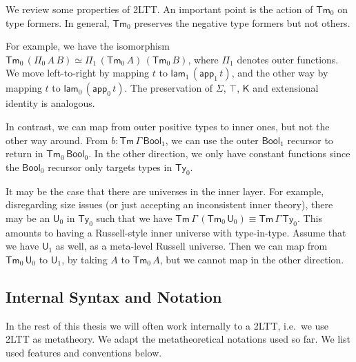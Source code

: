 \documentclass[12pt,a4paper,twoside,openany]{book}
\theoremstyle{remark}
\theoremstyle{definition}
\theoremstyle{theorem}
\newcommand{\ms}[1]{\mathsf{#1}}
\newcommand{\Tm}{\mathsf{Tm}}
\newcommand{\Ty}{\mathsf{Ty}}
\newcommand{\U}{\mathsf{U}}
\newcommand{\K}{\mathsf{K}}
\newcommand{\app}{\ms{app}}
\newcommand{\Bool}{\ms{Bool}}
\newcommand{\lam}{\ms{lam}}
\begin{document}
We review some properties of 2LTT. An important point is the action of $\Tm_0$
on type formers. In general, $\Tm_0$ preserves the negative type formers but not
others.

For example, we have the isomorphism $\Tm_0\,(\Pi_0\,A\,B) \simeq
\Pi_1\,(\Tm_0\,A)\,(\Tm_0\,B)$, where $\Pi_1$ denotes outer functions.  We move
left-to-right by mapping $t$ to $\lam_1\,(\app_1\,t)$, and the other way by
mapping $t$ to $\lam_0\,(\app_0\,t)$. The preservation of $\Sigma$, $\top$, $\K$
and extensional identity is analogous.

In contrast, we can map from outer positive types to inner ones, but not the
other way around. From $b : \Tm\,\Gamma\,\Bool_1$, we can use the outer
$\Bool_1$ recursor to return in $\Tm_0\,\Bool_0$. In the other direction, we
only have constant functions since the $\Bool_0$ recursor only targets types in
$\Ty_0$.

It may be the case that there are universes in the inner layer. For example,
disregarding size issues (or just accepting an inconsistent inner theory), there
may be an $\U_0$ in $\Ty_0$ such that we have $\Tm\,\Gamma\,(\Tm_0\,\U_0) \equiv
\Tm\,\Gamma\,\Ty_0$. This amounts to having a Russell-style inner universe with
type-in-type. Assume that we have $\U_1$ as well, as a meta-level Russell
universe. Then we can map from $\Tm_0\,\U_0$ to $\U_1$, by taking $A$ to
$\Tm_0\,A$, but we cannot map in the other direction.

\subsection{Internal Syntax and Notation}
\label{sec:2ltt-internal-syntax}

In the rest of this thesis we will often work internally to a 2LTT, i.e.\ we use
2LTT as metatheory. We adapt the metatheoretical notations used so far. We list
used features and conventions below.
\end{document}
